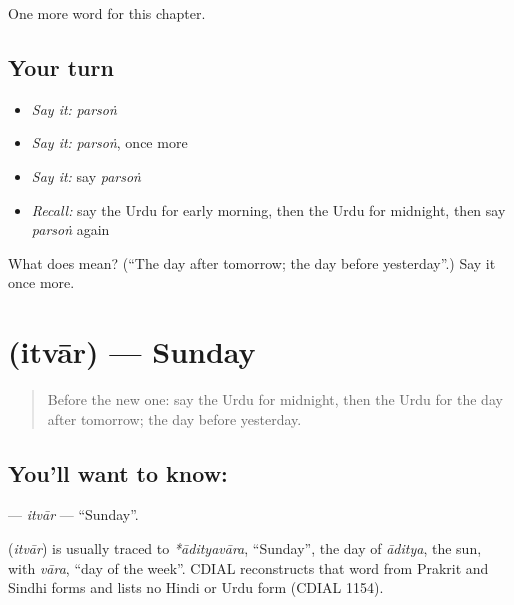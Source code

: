 \begin{grammarlens}[title={What you've built}]
One more word for this chapter.
\end{grammarlens}

\subsection*{Your turn}
\begin{itemize}
\raggedright
  \item \emph{Say it:} \emph{parsoṅ}
  \item \emph{Say it:} \emph{parsoṅ}, once more
  \item \emph{Say it:} say \emph{parsoṅ}
  \item \emph{Recall:} say the Urdu for early morning, then the Urdu for midnight, then say \emph{parsoṅ} again
\end{itemize}

\begin{tcolorbox}[breakable,colback=teal!4,colframe=teal!35!black,title={Before you move on}]
What does  mean? (\textquotedblleft{}The day after tomorrow; the day before yesterday\textquotedblright{}.) Say it once more.
\end{tcolorbox}
\section[\texorpdfstring{\ur{اتوار} (itvār)}{اتوار (itvār)}]{ (itvār) — Sunday}

\label{lesson:UR-C91-itvar}



\begin{quote}
Before the new one: say the Urdu for midnight, then the Urdu for the day after tomorrow; the day before yesterday.
\end{quote}

\subsection*{You'll want to know: }
\textbf{} — \emph{itvār} — \textquotedblleft{}Sunday\textquotedblright{}.

\begin{cousinweb}
\textbf{} (\emph{itvār}) is usually traced to \emph{*ādityavāra}, \textquotedblleft{}Sunday\textquotedblright{}, the day of \emph{āditya}, the sun, with \emph{vāra}, \textquotedblleft{}day of the week\textquotedblright{}. CDIAL reconstructs that word from Prakrit and Sindhi forms and lists no Hindi or Urdu form (CDIAL 1154).
\end{cousinweb}

